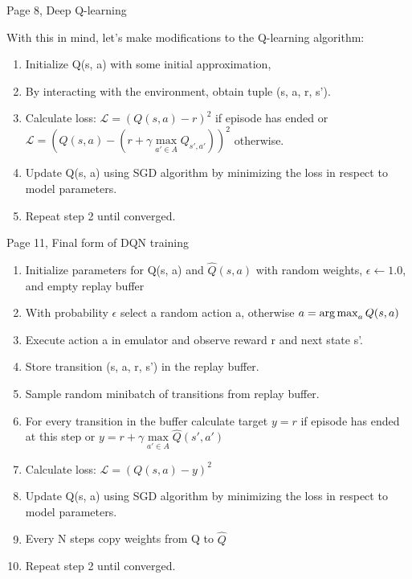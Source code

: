 Page 8, Deep Q-learning

With this in mind, let's make modifications to the Q-learning algorithm:
\begin{enumerate}
  \item Initialize Q(s, a) with some initial approximation,
  \item By interacting with the environment, obtain tuple (s, a, r, s').
  \item Calculate loss:
    \begin{math}\mathcal{L} = (Q(s,a) - r)^2\end{math} if episode has ended or
      \begin{math}\mathcal{L} = (Q(s,a) - (r + \gamma \max\limits_{a' \in
          A}Q_{s',a'}))^2\end{math} otherwise.
  \item Update Q(s, a) using SGD algorithm by minimizing the loss in respect to model parameters.
  \item Repeat step 2 until converged.
\end{enumerate}

Page 11, Final form of DQN training
\begin{enumerate}
  \item Initialize parameters for Q(s, a) and \begin{math}\hat{Q}(s, a)\end{math} with random
    weights, \begin{math}\epsilon \leftarrow 1.0\end{math}, and empty replay buffer
  \item With probability \begin{math}\epsilon\end{math} select a random action a, otherwise
    \begin{math}a = \operatorname*{arg\,max}_aQ(s, a)\end{math}
  \item Execute action a in emulator and observe reward r and next state s'.
  \item Store transition (s, a, r, s') in the replay buffer.
  \item Sample random minibatch of transitions from replay buffer.
  \item For every transition in the buffer calculate target \begin{math}y = r\end{math} 
    if episode has ended at this step or
    \begin{math}y = r + \gamma \max\limits_{a' \in A} \hat{Q}(s',a')\end{math}
  \item Calculate loss: \begin{math}\mathcal{L} = (Q(s, a) - y)^2\end{math}
  \item Update Q(s, a) using SGD algorithm by minimizing the loss in respect to model parameters.
  \item Every N steps copy weights from Q to \begin{math}\hat{Q}\end{math}
  \item Repeat step 2 until converged.
\end{enumerate}



